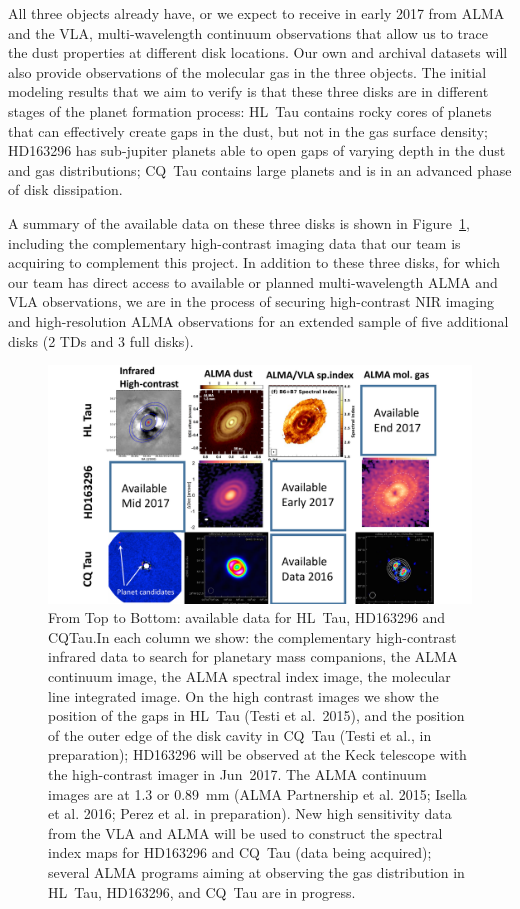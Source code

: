 \documentclass[10pt,fleqn,twoside]{article}
\begin{document}
All three objects already have, or we expect to receive in early 2017 from ALMA and the VLA, multi-wavelength continuum observations that allow us to trace the dust properties at different disk locations. Our own and archival datasets will also provide observations of the molecular gas in the three objects.
The initial modeling results that we aim to verify is that these three disks are in different stages of the planet formation process: HL~Tau contains rocky cores of planets that can effectively create gaps in the dust, but not in the gas surface density; HD163296 has sub-jupiter planets able to open gaps of varying depth in the dust and gas distributions; CQ~Tau contains large planets and is in an advanced phase of disk dissipation.

A summary of the available data on these three disks is shown in Figure~\ref{f_nir_alma}, including the complementary high-contrast imaging data that our team is acquiring to complement this project. In addition to these three disks, for which our team has direct access to available or planned multi-wavelength ALMA and VLA observations, we are in the process of securing high-contrast NIR imaging and high-resolution ALMA observations for an extended sample of five additional disks (2 TDs and 3 full disks).

\begin{figure}
\includegraphics[scale=0.4,angle=0]{f_highres_data.pdf}
\caption{From Top to Bottom: available data for HL~Tau, HD163296 and CQTau.In each column we show: the complementary high-contrast infrared data to search for planetary mass companions, the ALMA continuum image, the ALMA spectral index image, the molecular line integrated image. On the high contrast images we show the position of the gaps in HL~Tau (Testi et al.~2015), and the position of the outer edge of the 
disk cavity in CQ~Tau (Testi et al., in preparation); HD163296 will be observed at the Keck telescope with the high-contrast imager in Jun~2017. The ALMA continuum images are at 1.3 or 0.89~mm (ALMA Partnership et al. 2015; Isella et al. 2016; Perez et al. in preparation). New high sensitivity data from the VLA and ALMA will be used to construct the spectral index maps for HD163296 and CQ~Tau (data being acquired); several ALMA programs aiming at observing the gas distribution in HL~Tau, HD163296, and CQ~Tau are in progress.}
\label{f_nir_alma}
\end{figure}
\end{document}
